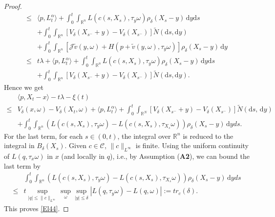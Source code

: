 \documentclass[11pt,reqno]{amsart}
\theoremstyle{definition}
\theoremstyle{remark}
\numberwithin{equation}{section}
\newcommand{\R}{{\mathbb{R}}}
\newcommand{\dd}{\mathrm{d}}
\begin{document}
\begin{proof}
\begin{equation*}
\begin{aligned}
     \leq  & \langle p, L^{\alpha}_{t} \rangle + \int_{0}^{t}\int_{\mathbb{R}^n} L(c(s, X_{s}), \tau_{y}\omega)\rho_{\delta}(X_{s}-y)\,\mathrm{d}y\dd s \nonumber \\
     & + \int_{0}^{t} \int_{\mathbb{R}^n} [V_{\delta}(X_{s^{-}}+ y)-V_{\delta}(X_{s^{-}})]\widetilde{N}(\mathrm{d}s,\mathrm{d}y) \nonumber \\
     & + \int_{0}^{t}\int_{\mathbb{R}^n} [\mathscr{J} \widetilde{v}(y,\omega) + H(p + \widetilde{v}(y,\omega), \tau_y\omega)]\rho_{\delta}(X_{s}-y)\,\mathrm{d}y \nonumber\\
     \leq & t\lambda  + \langle p, L^{\alpha}_{t} \rangle + \int_{0}^{t}\int_{\mathbb{R}^n} L(c(s, X_{s}), \tau_{y}\omega)\rho_{\delta}(X_s-y)\,\mathrm{d}y\dd s \nonumber\\
     & + \int_{0}^{t} \int_{\mathbb{R}^n} [V_{\delta}(X_{s^{-}}+ y)-V_{\delta}(X_{s^{-}})]\widetilde{N}(\mathrm{d}s,\mathrm{d}y).
\end{aligned}
\end{equation*}
Hence we get
\begin{align}
    &  \langle p, X_{t} - x \rangle - t\lambda - \xi(t) \nonumber \\
    \leq & V_{\delta}(x,\omega)- V_{\delta}(X_{t},\omega) + \langle p, L^{\alpha}_{t} \rangle + \int_{0}^{t} \int_{\mathbb{R}^N} [V_{\delta}(X_{s^{-}}+ y)-V_{\delta}(X_{s^{-}})]\widetilde{N}(\mathrm{d}s,\,\mathrm{d}y) \nonumber \\
    & + \int^{t}_{0}\int_{\mathbb{R}^n} (L(c(s, X_{s}), \tau_{y}\omega)- L(c(s, X_{s}), \tau_{X_{s}}\omega))\rho_{\delta}(X_{s}-y)\,\mathrm{d}yds. 
\end{align}
For the last term, for each $s\in (0,t)$, the integral over $\R^n$ is reduced to the integral in $B_\delta(X_{s})$. Given $c\in \mathscr{C}$, $\|c\|_{L^\infty}$ is finite. Using the uniform continuity of $L(q,\tau_{x}\omega)$ in $x$ (and locally in $q$), i.e., by Assumption ({\bf{A2}}), we can bound the last term by
\begin{align}\label{Remainder}
        & \int^{t}_{0}\int_{\mathbb{R}^n} (L(c(s, X_{s}), \tau_{y}\omega)- L(c(s, X_{s}), \tau_{X_{s}}\omega))\rho_{\delta}(X_{s}-y)\,\mathrm{d}yds \nonumber \\
        \leq & t\sup_{|q| \leq \|c\|_{L^{\infty}}}\sup_{\omega}\sup_{|y| \leq \delta}|L(q,\tau_{y}\omega) - L(q,\omega)| := tr_{c}(\delta).
\end{align}
This proves \eqref{El44}.


\end{proof}
\end{document}
